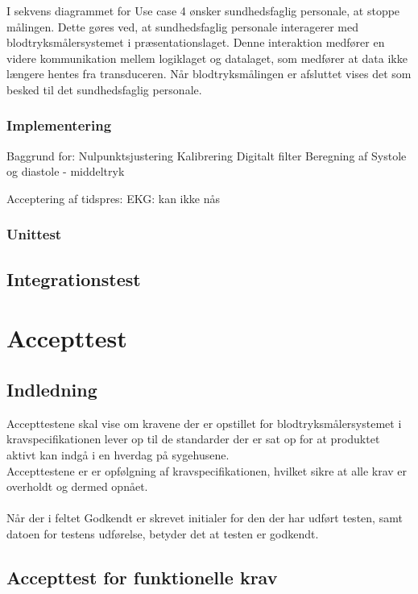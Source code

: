 I sekvens diagrammet for Use case 4 ønsker sundhedsfaglig personale, at stoppe målingen. Dette gøres ved, at sundhedsfaglig personale interagerer med blodtryksmålersystemet i præsentationslaget. Denne interaktion medfører en videre kommunikation mellem logiklaget og datalaget, som medfører at data ikke længere hentes fra transduceren. Når blodtryksmålingen er afsluttet vises det som besked til det sundhedsfaglig personale. 

\subsection{Implementering}


Baggrund for:
Nulpunktsjustering 
Kalibrering 
Digitalt filter
Beregning af Systole og diastole - middeltryk

Acceptering af tidspres: EKG: kan ikke nås



\subsection{Unittest}

\section{Integrationstest}


\chapter{Accepttest}
\section{Indledning}
Accepttestene skal vise om kravene der er opstillet for blodtryksmålersystemet i kravspecifikationen lever op til de standarder der er sat op for at produktet aktivt kan indgå i en hverdag på sygehusene.\\
Accepttestene er er opfølgning af kravspecifikationen, hvilket sikre at alle krav er overholdt og dermed opnået.\\\\
Når der i feltet Godkendt er skrevet initialer for den der har udført testen, samt datoen for testens udførelse, betyder det at testen er godkendt.  \\

\section{Accepttest for funktionelle krav}
